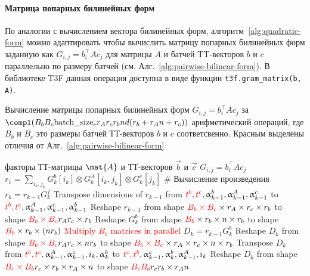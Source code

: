 \paragraph{Матрица попарных билинейных форм}
По аналогии с вычислением вектора билинейных форм, алгоритм~\ref{alg:quadratic-form} можно адаптировать чтобы  вычислить матрицу попарных билинейных форм заданную как $G_{i,j} = b_i^\intercal A c_j$ для матрицы $A$ и батчей TT-векторов $b$ и $c$ параллельно по размеру батчей (см. Алг.~\ref{alg:pairwise-bilinear-form}). В библиотеке T3F данная операция доступна в виде функции \texttt{t3f.gram\_matrix(b, A)}.

\begin{algorithm}[tb]
   \caption{Вычисление матрицы попарных билинейных форм $G_{i,j} = b_i^\intercal A c_j$ за $\compl(B_b B_c \text{batch\_size}_c r_A r_c r_b n d (r_b + r_A n + r_c))$ арифметический операций, где $B_b$ и $B_c$ это размеры батчей ТТ-векторов $b$ и $c$ соответсвенно. Красным выделены отличия от Алг.~\ref{alg:pairwise-bilinear-form}}
   \label{alg:quadratic-form}
\begin{algorithmic}[1]
   \REQUIRE факторы ТТ-матрицы $\mat{A}$ и ТТ-векторов $\vec{b}$ и $\vec{c}$
   \ENSURE $G_{i,j} = b_i^\intercal A c_j$
   \STATE $r_1 = \sum_{i_k, j_k} G_k^b[i_k] \otimes G_k^A[i_k, j_k] \otimes G_k^c[j_k]$
   \STATE \# Вычисление произведения $r_k = r_{k-1}G_k^f$
   \STATE Transpose dimensions of $r_{k-1}$ from $\textcolor{red}{t^b, t^c}, \alpha_{k-1}^b,\alpha_{k-1}^A, \alpha_{k-1}^c$ to $\textcolor{red}{t^b, t^c}, \alpha_{k-1}^A, \alpha_{k-1}^c,\alpha_{k-1}^b$
   \STATE Reshape $r_{k-1}$ from shape $\textcolor{red}{B_b \times B_c} \times r_A \times r_c \times r_b$ to shape $\textcolor{red}{B_b \times B_c} r_A  r_c \times r_b$
   \STATE Reshape $G_k^b$ from shape $\textcolor{red}{B_b} \times r_b \times n \times r_b$ to shape $\textcolor{red}{B_b} \times r_b \times (n r_b)$
   \STATE \textcolor{red}{Multiply $B_b$ matrices in parallel} $D_k = r_{k-1} G_k^b$ 
   \STATE Reshape $D_k$ from shape $\textcolor{red}{B_b \times B_c} r_A r_c \times n r_b$ to shape $\textcolor{red}{B_b \times B_c} \times r_A \times r_c \times n \times r_b$
   \STATE Transpose $D_k$ from $\textcolor{red}{t^b, t^c}, \alpha_{k-1}^A, \alpha_{k-1}^c,i_k,\alpha_{k}^b$ to $\textcolor{red}{t^c, t^b},\alpha_{k-1}^c,\alpha_{k}^b,\alpha_{k-1}^A,i_k$
   \STATE Reshape $D_k$ from shape $\textcolor{red}{B_c \times B_b} r_c \times r_b \times r_A \times n$ to shape $\textcolor{red}{B_c B_b} r_c r_b \times r_A n$

\end{algorithmic}
\end{algorithm}
